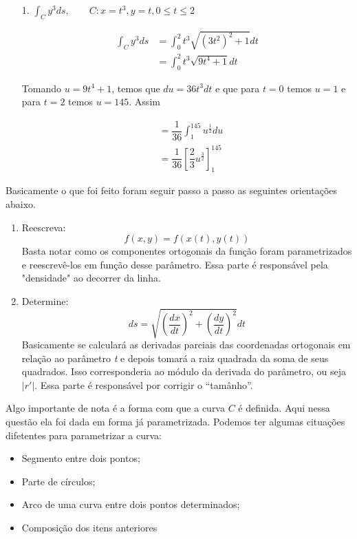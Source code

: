 \begin{enumerate}
\item[1.] $\int_C y^3 ds, \qquad C:x=t^3, y=t, 0\leq t \leq 2$

\begin{equation}\label{16.2}
\begin{split}
\int_C y^3 ds&=\int_0^2 t^3 \sqrt{(3t^2)^2+1} dt\\
&=\int_0^2 t^3 \sqrt{9t^4+1} dt
\end{split}
\end{equation}

Tomando $u=9t^4+1$, temos que $du=36 t^3 dt$ e que para $t=0$ temos $u=1$ e para $t=2$ temos $u=145$. Assim

\begin{equation}\label{16.3}
\begin{split}
&=\dfrac{1}{36}\int_1^{145} u^{\frac{1}{2}} du\\
&=\dfrac{1}{36} \left[ \dfrac{2}{3} u^\frac{3}{2} \right]_1^{145}
\end{split}
\end{equation}

\end{enumerate}

Basicamente o que foi feito foram seguir passo a passo as seguintes orientações abaixo.

\begin{enumerate}
\item Reescreva:
$$f(x,y)=f(x(t),y(t))$$
Basta notar como os componentes ortogonais da função foram parametrizados e reescrevê-los em função desse parâmetro. Essa parte é responsável pela "densidade" ao decorrer da linha.

\item Determine: $$ds=\sqrt{\left(\dfrac{dx}{dt} \right)^2+\left(\dfrac{dy}{dt} \right)^2} dt$$
Basicamente se calculará as derivadas parciais das coordenadas ortogonais em relação ao parâmetro \textit{t} e depois tomará a raiz quadrada da soma de seus quadrados. Isso corresponderia ao módulo da derivada do parâmetro, ou seja $|r'|$. Essa parte é responsável por corrigir o ``tamânho''.
\end{enumerate}

Algo importante de nota é a forma com que a curva $C$ é definida. Aqui nessa questão ela foi dada em forma já parametrizada. Podemos ter algumas cituações difetentes para parametrizar a curva:

\begin{itemize}
\item Segmento entre dois pontos;
\item Parte de círculos;
\item Arco de uma curva entre dois pontos determinados;
\item Composição dos itens anteriores
\end{itemize}

